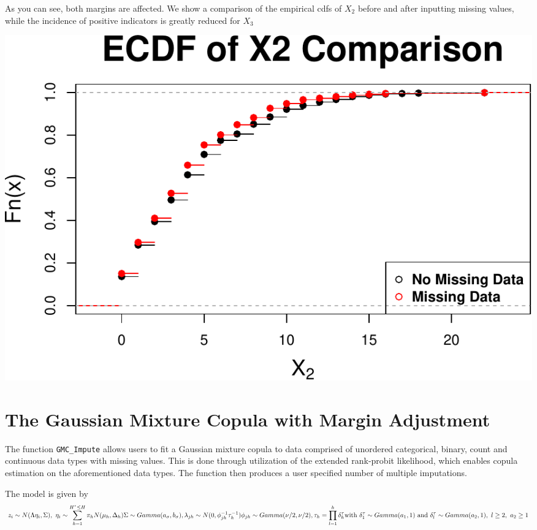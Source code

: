 \documentclass[
]{article}
\begin{document}
As you can see, both margins are affected. We show a comparison of the
empirical cdfs of \(X_{2}\) before and after inputting missing values,
while the incidence of positive indicators is greatly reduced for
\(X_{3}\)

\includegraphics{README_files/figure-latex/unnamed-chunk-3-1.pdf}

\hypertarget{the-gaussian-mixture-copula-with-margin-adjustment}{%
\section{The Gaussian Mixture Copula with Margin
Adjustment}\label{the-gaussian-mixture-copula-with-margin-adjustment}}

The function \texttt{GMC\_Impute} allows users to fit a Gaussian mixture
copula to data comprised of unordered categorical, binary, count and
continuous data types with missing values. This is done through
utilization of the extended rank-probit likelihood, which enables copula
estimation on the aforementioned data types. The function then produces
a user specified number of multiple imputations.

The model is given by
\[z_{i} \sim N(\Lambda \eta_{i}, \Sigma),\ \eta_{i} \sim \sum_{h=1}^{H^{*}\leq H} \pi_{h}N(\mu_{h},\Delta_{h})\\
\Sigma \sim Gamma(a_{\sigma},b_{\sigma}),\lambda_{jh} \sim N(0, \phi_{jh}^{-1}\tau_{h}^{-1})\\
\phi_{jh} \sim Gamma(\nu/2,\nu/2), \tau_{h} = \prod_{l=1}^{h}\delta_{h}^{\tau} \\
\text{with} \ \delta^{\tau}_{1} \sim Gamma(a_{1},1) \ \text{and} \ \delta^{\tau}_{l} \sim Gamma(a_{2},1), \ l\geq 2, \ a_{2} \geq 1\]
\end{document}
